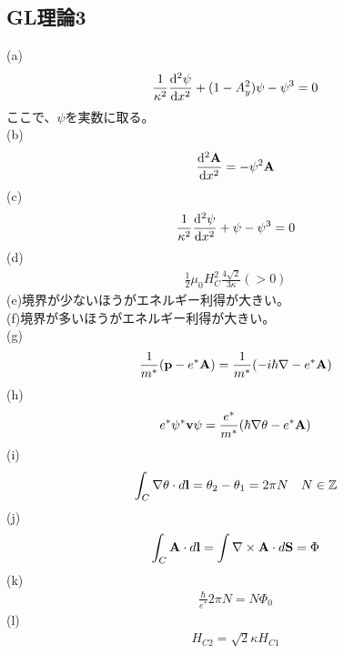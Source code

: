 \documentclass[a4paper,11pt]{jsarticle}
\numberwithin{equation}{section}
\begin{document}
\subsection{GL理論3}
(a)\\
\begin{align}
  \frac{1}{\kappa^2}\dv[2]{\psi}{x}+ (1-A_y^2)\psi - \psi^3 = 0
\end{align}
ここで、$\psi$を実数に取る。\\
(b)\\
\begin{align}
  \dv[2]{\vb{A}}{x} = -\psi^2\vb{A}
\end{align}
(c)\\
\begin{align}
  \frac{1}{\kappa^2}\dv[2]{\psi}{x} + \psi - \psi^3 = 0
\end{align}
(d)\\
\begin{align}
  \frac{1}{2}\mu_0 H_C^2 \frac{4\sqrt{2}}{3\kappa} (>0)
\end{align}
(e)境界が少ないほうがエネルギー利得が大きい。\\
(f)境界が多いほうがエネルギー利得が大きい。\\
(g)\\
\begin{align}
  \frac{1}{m^*}(\vb{p}-e^{*}\vb{A}) = \frac{1}{m^*}(-i\hbar\nabla - e^{*}\vb{A})
\end{align}
(h)\\
\begin{align}
  e^{*}\psi^*\vb{v}\psi = \frac{e^{*}}{m^*}(\hbar\nabla\theta - e^{*}\vb{A})
\end{align}
(i)\\
\begin{align}
  \int_{C} \nabla \theta \cdot d\vb{l} = \theta_2 - \theta_1 = 2\pi N \quad N \in \mathbb{Z}
\end{align}
(j)\\
\begin{align}
  \int_{C} \vb{A} \cdot d\vb{l} = \int \nabla \times \vb{A} \cdot d\vb{S} = \Phi
\end{align}
(k)\\
\begin{align}
  \frac{\hbar}{e^{*}}2\pi N = N\Phi_0
\end{align}
(l)\\
\begin{align}
  H_{C2} = \sqrt{2}\kappa H_{C1}
\end{align}
\end{document}
